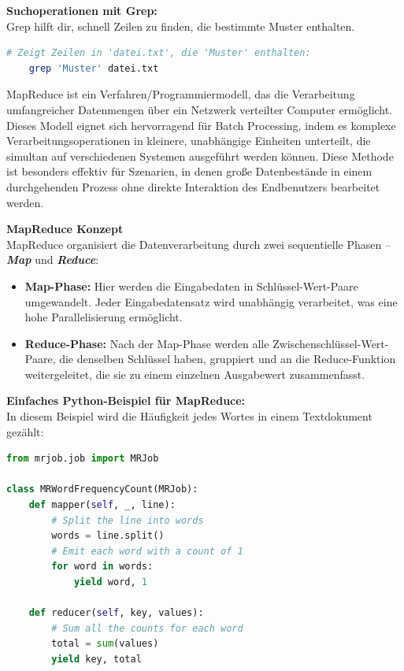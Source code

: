 \documentclass[9pt]{innovativeinnovation-cheatsheet}
\begin{document}
\begin{multicols*}{4}
\textbf{Suchoperationen mit Grep:} \\
Grep hilft dir, schnell Zeilen zu finden, die bestimmte Muster enthalten.

\begin{lstlisting}[language=bash, numbers=none]
	# Zeigt Zeilen in 'datei.txt', die 'Muster' enthalten:
	grep 'Muster' datei.txt
\end{lstlisting}



MapReduce ist ein Verfahren/Programmiermodell, das die Verarbeitung umfangreicher Datenmengen über ein Netzwerk verteilter Computer ermöglicht. Dieses Modell eignet sich hervorragend für Batch Processing, indem es komplexe Verarbeitungsoperationen in kleinere, unabhängige Einheiten unterteilt, die simultan auf verschiedenen Systemen ausgeführt werden können. Diese Methode ist besonders effektiv für Szenarien, in denen große Datenbestände in einem durchgehenden Prozess ohne direkte Interaktion des Endbenutzers bearbeitet werden.

\textbf{MapReduce Konzept} \\
MapReduce organisiert die Datenverarbeitung durch zwei sequentielle Phasen – \textbf{\textit{Map}} und \textbf{\textit{Reduce}}:
\begin{itemize}
	\item \textbf{Map-Phase:} Hier werden die Eingabedaten in Schlüssel-Wert-Paare umgewandelt. Jeder Eingabedatensatz wird unabhängig verarbeitet, was eine hohe Parallelisierung ermöglicht.
	\item \textbf{Reduce-Phase:} Nach der Map-Phase werden alle Zwischenschlüssel-Wert-Paare, die denselben Schlüssel haben, gruppiert und an die Reduce-Funktion weitergeleitet, die sie zu einem einzelnen Ausgabewert zusammenfasst.
\end{itemize}

\textbf{Einfaches Python-Beispiel für MapReduce:} \\
In diesem Beispiel wird die Häufigkeit jedes Wortes in einem Textdokument gezählt:

\begin{lstlisting}[language=python, numbers=none]
from mrjob.job import MRJob
	
class MRWordFrequencyCount(MRJob):
	def mapper(self, _, line):
		# Split the line into words
		words = line.split()
		# Emit each word with a count of 1
		for word in words:
			yield word, 1
	
	def reducer(self, key, values):
		# Sum all the counts for each word
		total = sum(values)
		yield key, total
	

\end{lstlisting}
\end{multicols*}
\end{document}
